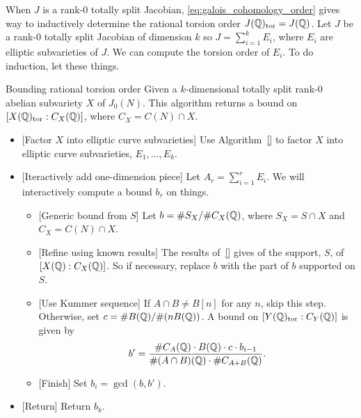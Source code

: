 \documentclass[11pt, proquest]{uwthesis}
\begin{document}
When $J$ is a rank-0 totally split Jacobian, \eqref{eq:galois_cohomology_order}
gives way to inductively determine the rational torsion order
$J(\mathbb{Q})_{\mathrm{tor}}=J(\mathbb{Q})$. Let $J$ be a rank-0 totally split Jacobian of dimension
$k$ so $J = \sum_{i=1} ^k E_i$, where $E_i$ are elliptic subvarieties of $J$.
We can compute the torsion order of $E_i$. To do induction, let these things.

\begin{algorithm}{Bounding rational torsion order}%
    \label{alg:bound_rational_torsion_order}
    Given a $k$-dimensional totally split rank-0 abelian subvariety $X$ of
    $J_0(N)$. This algorithm returns a bound on $[X(\mathbb{Q})_{\mathrm{tor}}:C_X(\mathbb{Q})]$, where
    $C_X=C(N)\cap X$.
    \begin{itemize}
        \item{} [Factor $X$ into elliptic curve subvarieties] 
            Use Algorithm~\ref{} to factor $X$ into elliptic curve
            subvarieties, $E_1,\ldots,E_k$.
        \item{} [Iteractively add one-dimension piece]
            Let $A_r = \sum_{i=1} ^r E_i$. We will interactively compute a
            bound $b_r$ on things. %
            \begin{itemize}
                \item{} [Generic bound from $S$]
                    Let $b=\# S_X/\#C_X(\mathbb{Q})$, where $S_X=S\cap X$ and
                    $C_X=C(N)\cap X$.
                \item{} [Refine using known results]
                    The results of~\ref{} gives of the support, $S$, of
                    $[X(\mathbb{Q}):C_X(\mathbb{Q})]$. So if
                    necessary, replace $b$ with the part of $b$ supported on
                    $S$.
                \item{} [Use Kummer sequence]
                    If $A\cap B\neq B[n]$ for any $n$, skip this step.
                    Otherwise, set $c=\# B(\mathbb{Q}) / \#(nB(\mathbb{Q}))$.
                    A bound on $[Y(\mathbb{Q})_{\mathrm{tor}}:C_Y(\mathbb{Q})]$ is given by
                    \[
                        b' =
                        \frac{\#C_A(\mathbb{Q})\cdot B(\mathbb{Q})\cdot c\cdot
                        b_{i-1}}{\#(A\cap B)(\mathbb{Q})\cdot\# C_{A+B}(\mathbb{Q})}.
                    \]
                \item{} [Finish]
                    Set $b_i=\gcd(b,b')$.
            \end{itemize}
        \item{} [Return]
            Return $b_k$.
    \end{itemize}
\end{algorithm}
\end{document}
